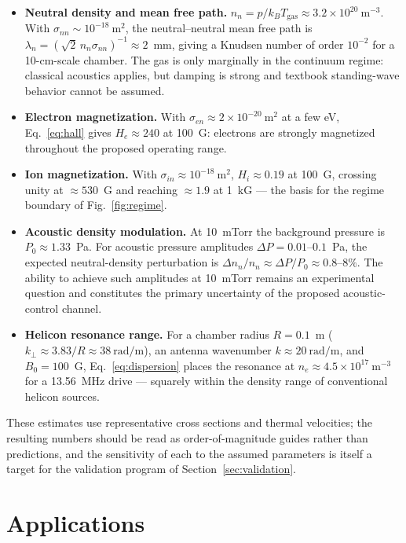 \documentclass[11pt]{article}
\begin{document}
\begin{itemize}
    \item \textbf{Neutral density and mean free path.} $n_n = p / k_B T_{\mathrm{gas}} \approx 3.2\times10^{20}\ \mathrm{m}^{-3}$. With $\sigma_{nn} \sim 10^{-18}\ \mathrm{m}^2$, the neutral--neutral mean free path is $\lambda_n = (\sqrt{2}\, n_n \sigma_{nn})^{-1} \approx 2$~mm, giving a Knudsen number of order $10^{-2}$ for a 10-cm-scale chamber. The gas is only marginally in the continuum regime: classical acoustics applies, but damping is strong and textbook standing-wave behavior cannot be assumed.
    \item \textbf{Electron magnetization.} With $\sigma_{en} \approx 2\times10^{-20}\ \mathrm{m}^2$ at a few eV, Eq.~\eqref{eq:hall} gives $H_e \approx 240$ at 100~G: electrons are strongly magnetized throughout the proposed operating range.
    \item \textbf{Ion magnetization.} With $\sigma_{in} \approx 10^{-18}\ \mathrm{m}^2$, $H_i \approx 0.19$ at 100~G, crossing unity at $\approx 530$~G and reaching $\approx 1.9$ at 1~kG --- the basis for the regime boundary of Fig.~\ref{fig:regime}.
    \item \textbf{Acoustic density modulation.} At 10~mTorr the background pressure is $P_0 \approx 1.33$~Pa. For acoustic pressure amplitudes $\Delta P = 0.01$--$0.1$~Pa, the expected neutral-density perturbation is $\Delta n_n / n_n \approx \Delta P / P_0 \approx 0.8$--$8\%$. The ability to achieve such amplitudes at 10~mTorr remains an experimental question and constitutes the primary uncertainty of the proposed acoustic-control channel.
    \item \textbf{Helicon resonance range.} For a chamber radius $R = 0.1$~m ($k_\perp \approx 3.83/R \approx 38\ \mathrm{rad/m}$), an antenna wavenumber $k \approx 20\ \mathrm{rad/m}$, and $B_0 = 100$~G, Eq.~\eqref{eq:dispersion} places the resonance at $n_e \approx 4.5\times10^{17}\ \mathrm{m}^{-3}$ for a 13.56~MHz drive --- squarely within the density range of conventional helicon sources.
\end{itemize}

These estimates use representative cross sections and thermal velocities; the resulting numbers should be read as order-of-magnitude guides rather than predictions, and the sensitivity of each to the assumed parameters is itself a target for the validation program of Section~\ref{sec:validation}.

\section{Applications}
\end{document}
